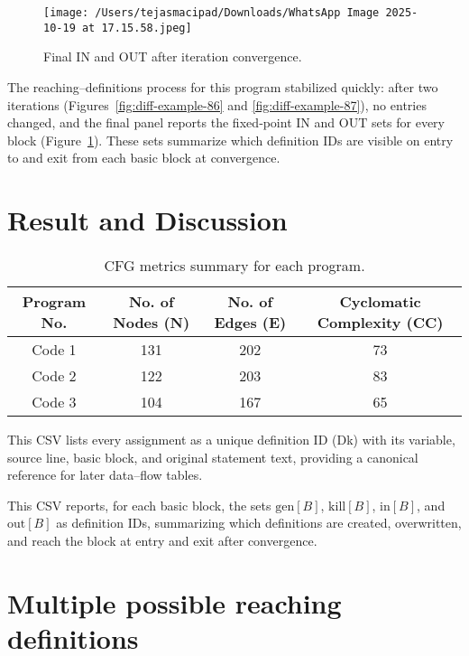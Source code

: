 \documentclass[12pt, a4paper]{report}
\begin{document}
\begin{figure}[H]
\centering
\texttt{[image: /Users/tejasmacipad/Downloads/WhatsApp Image 2025-10-19 at 17.15.58.jpeg]}
\caption{Final IN and OUT after iteration convergence.}
\label{fig:diff-example-88}
\end{figure}

\noindent
The reaching–definitions process for this program stabilized quickly: after two iterations (Figures~\ref{fig:diff-example-86} and \ref{fig:diff-example-87}), no entries changed, and the final panel reports the fixed‑point \(\mathrm{IN}\) and \(\mathrm{OUT}\) sets for every block (Figure~\ref{fig:diff-example-88}). These sets summarize which definition IDs are visible on entry to and exit from each basic block at convergence.


\section{Result and Discussion}

\begin{table}[H]
\centering
\renewcommand{\arraystretch}{1.2}
\setlength{\tabcolsep}{10pt}
\begin{tabular}{|c|c|c|c|}
\hline
\textbf{Program No.} & \textbf{No. of Nodes (N)} & \textbf{No. of Edges (E)} & \textbf{Cyclomatic Complexity (CC)} \\
\hline
Code 1 & 131 & 202 & 73 \\
Code 2 & 122 & 203 & 83 \\
Code 3 & 104 & 167 & 65 \\
\hline
\end{tabular}
\caption{CFG metrics summary for each program.}
\label{tab:cfg-metrics}
\end{table}

\noindent
This CSV lists every assignment as a unique definition ID (Dk) with its variable, source line, basic block, and original statement text, providing a canonical reference for later data–flow tables.

\noindent
This CSV reports, for each basic block, the sets \(\mathrm{gen}[B]\), \(\mathrm{kill}[B]\), \(\mathrm{in}[B]\), and \(\mathrm{out}[B]\) as definition IDs, summarizing which definitions are created, overwritten, and reach the block at entry and exit after convergence.

\section{Multiple possible reaching definitions}
\end{document}

